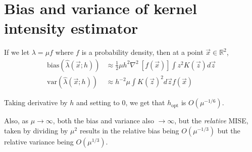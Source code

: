 \section{Bias and variance of kernel intensity estimator}

If we let \(\lambda = \mu f\) where \(f\) is a probability density, then at a point \(\vec{x} \in \mathbb{R}^2\),
\begin{align}
\mbox{bias}(\hat{\lambda}(\vec{x};h)) & \approx \frac{1}{2} \mu h^2 \nabla^2~\left[ f(\vec{x}) \right] \int {z^2 K(\vec{z}) d\vec{z}} \\
\mbox{var}(\hat{\lambda}(\vec{x};h)) & \approx h^{-2} \mu \int {K(\vec{z})^2d\vec{z}} f(\vec{x})
\end{align}

Taking derivative by \(h\) and setting to \(0\), we get that \(h_{\mbox{opt}}\) is \(O(\mu^{-1/6})\).

Also, as \(\mu \to \infty\), both the bias and variance also \(\to \infty\),
but the \textit{relative} MISE, taken by dividing by \(\mu^2\) results in the relative bias being \(O(\mu^{-1/3})\)
but the relative variance being \(O(\mu^{1/3})\).



